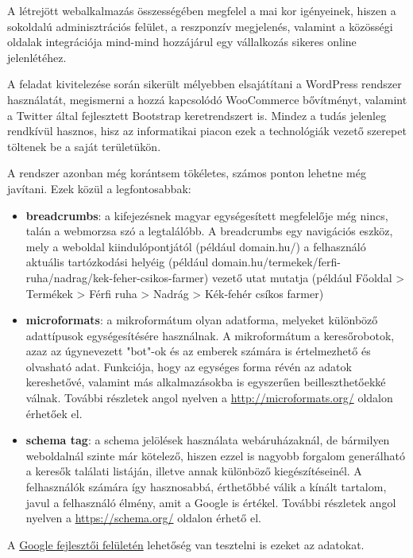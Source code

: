 \label{Chap:osszefoglalas}


A létrejött webalkalmazás összességében megfelel a mai kor igényeinek, hiszen a sokoldalú adminisztrációs felület, a reszponzív megjelenés, valamint a közösségi oldalak integrációja mind-mind hozzájárul egy vállalkozás sikeres online jelenlétéhez.

A feladat kivitelezése során sikerült mélyebben elsajátítani a WordPress rendszer használatát, megismerni a hozzá kapcsolódó WooCommerce bővítményt, valamint a Twitter által fejlesztett Bootstrap keretrendszert is. Mindez a tudás jelenleg rendkívül hasznos, hisz az informatikai piacon ezek a technológiák vezető szerepet töltenek be a saját területükön.

A rendszer azonban még korántsem tökéletes, számos ponton lehetne még javítani. Ezek közül a legfontosabbak:

\begin{itemize}
	\item \textbf{breadcrumbs}: a kifejezésnek magyar egységesített megfelelője még nincs, talán a webmorzsa szó a legtalálóbb. A breadcrumbs egy navigációs eszköz, mely a weboldal kiindulópontjától (például domain.hu/) a felhasználó aktuális tartózkodási helyéig (például domain.hu/termekek/ferfi-ruha/nadrag/kek-feher-csikos-farmer) vezető utat mutatja (például Főoldal > Termékek > Férfi ruha > Nadrág > Kék-fehér csíkos farmer)
	\item \textbf{microformats}: a mikroformátum olyan adatforma, melyeket különböző adattípusok egységesítésére használnak. A mikroformátum a keresőrobotok, azaz az úgynevezett "bot"-ok és az emberek számára is értelmezhető és olvasható adat. Funkciója, hogy az egységes forma révén az adatok kereshetővé, valamint más alkalmazásokba is egyszerűen beilleszthetőekké válnak.  További részletek angol nyelven a \url{http://microformats.org/} oldalon érhetőek el.
	\item \textbf{schema tag}: a schema jelölések használata webáruházaknál, de bármilyen weboldalnál szinte már kötelező, hiszen ezzel is nagyobb forgalom generálható a keresők találati listáján, illetve annak különböző kiegészítéseinél. A felhasználók számára így hasznosabbá, érthetőbbé válik a kínált tartalom, javul a felhasználó élmény, amit a Google is értékel. További részletek angol nyelven a \url{https://schema.org/} oldalon érhető el.
\end{itemize}

A \href{https://developers.google.com/structured-data/testing-tool/}{Google fejlesztői felületén} lehetőség van tesztelni is ezeket az adatokat.

